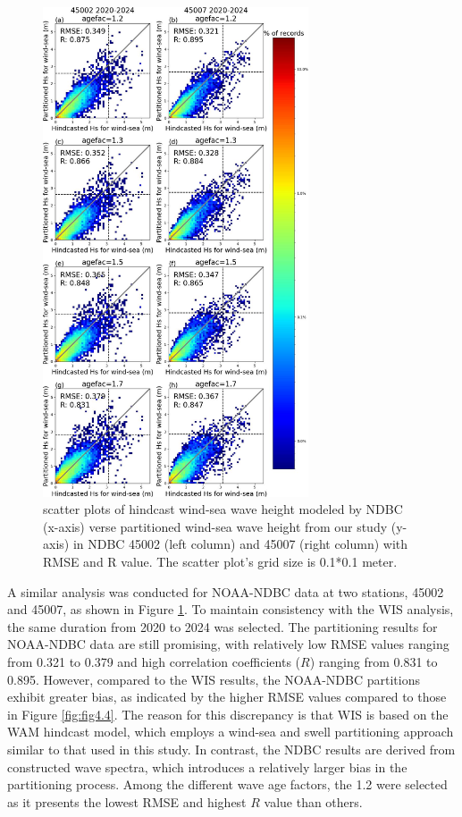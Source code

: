 \begin{figure}[htbp]
  \centering
  \includegraphics[width=0.7\textwidth]{chapter4/resources/figure4-5.jpg}
  \caption{scatter plots of hindcast wind-sea wave height modeled by NDBC
  (x-axis) verse partitioned wind-sea wave height from our study (y-axis) in
  NDBC 45002 (left column) and 45007 (right column) with RMSE and R value. The
  scatter plot’s grid size is 0.1*0.1 meter.}
  \label{fig:fig4.5}
\end{figure}

A similar analysis was conducted for NOAA-NDBC data at two stations, 45002 and
45007, as shown in Figure \ref{fig:fig4.5}. To maintain consistency with the WIS analysis,
the same duration from 2020 to 2024 was selected. The partitioning results for
NOAA-NDBC data are still promising, with relatively low RMSE values ranging from
0.321 to 0.379 and high correlation coefficients ($R$) ranging from 0.831 to
0.895. However, compared to the WIS results, the NOAA-NDBC partitions exhibit
greater bias, as indicated by the higher RMSE values compared to those in Figure
\ref{fig:fig4.4}. The reason for this discrepancy is that WIS is based on the WAM hindcast
model, which employs a wind-sea and swell partitioning approach similar to that
used in this study. In contrast, the NDBC results are derived from constructed
wave spectra, which introduces a relatively larger bias in the partitioning
process. Among the different wave age factors, the 1.2 were selected as it
presents the lowest RMSE and highest $R$ value than others.

